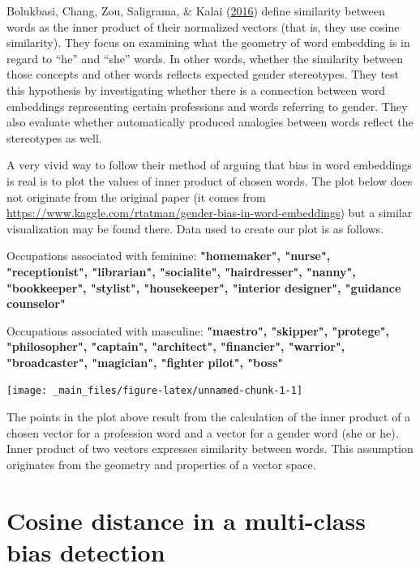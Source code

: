 \documentclass[12pt,]{book}
\begin{document}
Bolukbasi, Chang, Zou, Saligrama, \& Kalai
(\protect\hyperlink{ref-Bolukbasi2016Man}{2016}) define similarity
between words as the inner product of their normalized vectors (that is,
they use cosine similarity). They focus on examining what the geometry
of word embedding is in regard to ``he'' and ``she'' words. In other
words, whether the similarity between those concepts and other words
reflects expected gender stereotypes. They test this hypothesis by
investigating whether there is a connection between word embeddings
representing certain professions and words referring to gender. They
also evaluate whether automatically produced analogies between words
reflect the stereotypes as well.

A very vivid way to follow their method of arguing that bias in word
embeddings is real is to plot the values of inner product of chosen
words. The plot below does not originate from the original paper (it
comes from
\url{https://www.kaggle.com/rtatman/gender-bias-in-word-embeddings}) but
a similar visualization may be found there. Data used to create our plot
is as follows. \newline

Occupations associated with feminine:
\textbf{"homemaker", "nurse", "receptionist", "librarian", "socialite", "hairdresser", "nanny", "bookkeeper", "stylist", "housekeeper", "interior designer", "guidance counselor"}
\newline

Occupations associated with masculine:
\textbf{"maestro", "skipper", "protege", "philosopher", "captain", "architect", "financier", "warrior", "broadcaster", "magician", "fighter pilot", "boss"}
\newline

\vspace{1mm} \footnotesize

\begin{center}\texttt{[image: \_main\_files/figure-latex/unnamed-chunk-1-1]} \end{center}

\normalsize

The points in the plot above result from the calculation of the inner
product of a chosen vector for a profession word and a vector for a
gender word (she or he). Inner product of two vectors expresses
similarity between words. This assumption originates from the geometry
and properties of a vector space.

\section{Cosine distance in a multi-class bias
detection}\label{cosine-distance-in-a-multi-class-bias-detection}
\end{document}
